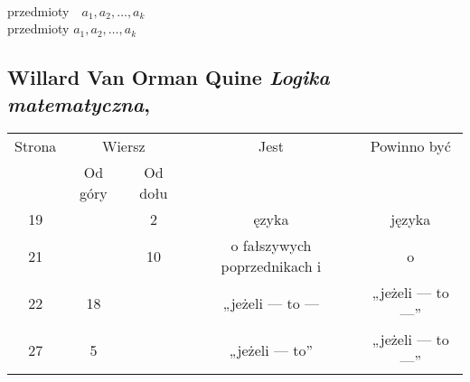 \documentclass[a4paper,11pt]{article}
\numberwithin{equation}{section}
\begin{document}
\VerSpaceSix


\noindent
{} \\
\Jest przedmioty~~$a_{ 1 }, a_{ 2 }, \ldots, a_{ k }$ \\
\PowinnoByc przedmioty $a_{ 1 }, a_{ 2 }, \ldots, a_{ k }$ \\













\newpage

\subsection{Willard Van Orman Quine \textit{Logika matematyczna},
  \cite{Quine-Logika-matematyczna-Pub-1974}}




\begin{center}

  \begin{tabular}{|c|c|c|c|c|}
    \hline
    Strona & \multicolumn{2}{c|}{Wiersz} & Jest
                              & Powinno być \\ \cline{2-3}
    & Od góry & Od dołu & & \\
    \hline
    19  & &  2 & ęzyka & języka \\
    21  & & 10 & o fałszywych poprzednikach i & o \\
    22  & 18 & & „jeżeli --- to --- & „jeżeli --- to ---” \\
    27  &  5 & & „jeżeli --- to” & „jeżeli --- to ---” \\
    \hline
  \end{tabular}

\end{center}

\VerSpaceSix


\end{document}
